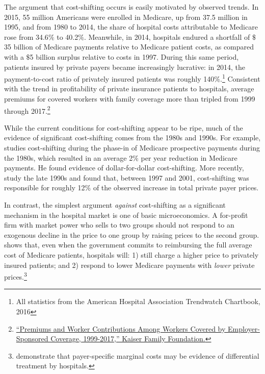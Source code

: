 \documentclass[12pt]{article}
\begin{document}
The argument that cost-shifting occurs is easily motivated by observed trends.  In 2015, 55 million Americans were enrolled in Medicare, up from 37.5 million in 1995, and from 1980 to 2014, the share of hospital costs attributable to Medicare rose from 34.6$\%$ to 40.2$\%$.  Meanwhile, in 2014, hospitals endured a shortfall of $\$$35 billion of Medicare payments relative to Medicare patient costs, as compared with a $\$$5 billion surplus relative to costs in 1997.  During this same period, patients insured by private payers became increasingly lucrative: in 2014, the payment-to-cost ratio of privately insured patients was roughly 140$\%$.\footnote{All statistics from the American Hospital Association Trendwatch Chartbook, 2016} Consistent with the trend in profitability of private insurance patients to hospitals, average premiums for covered workers with family coverage more than tripled from 1999 through 2017.\footnote{\href{https://www.kff.org/interactive/premiums-and-worker-contributions/?coverageGroup=family}{``Premiums and Worker Contributions Among Workers Covered by Employer-Sponsored Coverage, 1999-2017,'' Kaiser Family Foundation.}}

While the current conditions for cost-shifting appear to be ripe, much of the evidence of significant cost-shifting comes from the 1980s and 1990s.  For example, \cite{cutler1998costshift} studies cost-shifting during the phase-in of Medicare prospective payments during the 1980s, which resulted in an average 2$\%$ per year reduction in Medicare payments.  He found evidence of dollar-for-dollar cost-shifting.  More recently, \cite{zwanziger2006} study the late 1990s and found that, between 1997 and 2001, cost-shifting was responsible for roughly 12$\%$ of the observed increase in total private payer prices.

In contrast, the simplest argument \textit{against} cost-shifting as a significant mechanism in the hospital market is one of basic microeconomics.  A for-profit firm with market power who sells to two groups should not respond to an exogenous decline in the price to one group by raising prices to the second group.  \cite{hay1983} shows that, even when the government commits to reimbursing the full average cost of Medicare patients, hospitals will: 1) still charge a higher price to privately insured patients; and 2) respond to lower Medicare payments with \textit{lower} private prices.\footnote{\cite{dor1996} demonstrate that payer-specific marginal costs may be evidence of differential treatment by hospitals.}
\end{document}

